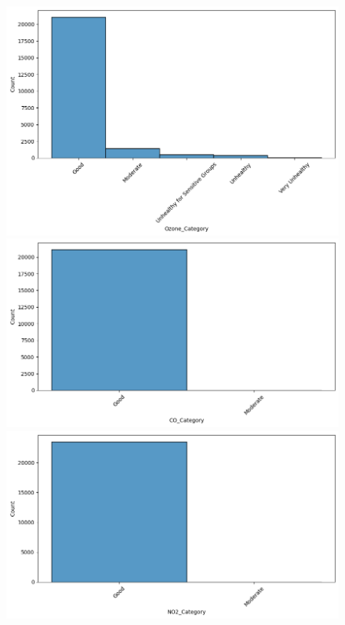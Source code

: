 \documentclass{article}
\begin{document}
\begin{figure}[htb]
    \centering
    \includegraphics[scale=0.33]{air_pollution/analysis/categorical/o3.png}
    \includegraphics[scale=0.33]{air_pollution/analysis/categorical/co.png}
    \includegraphics[scale=0.33]{air_pollution/analysis/categorical/no2.png}

\end{figure}
\end{document}
